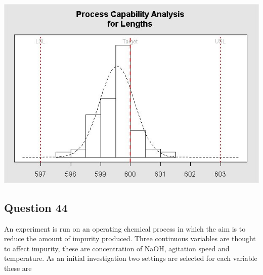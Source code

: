 \documentclass[a4paper,12pt]{article}
\begin{document}
\begin{center}
	\includegraphics[scale=0.55]{images/ExamQ4hist}
\end{center}
\newpage
%
%
%
\subsection*{Question 44}
An experiment is run on an operating chemical process in which the aim is to reduce the
amount of impurity produced. Three continuous variables are thought to affect impurity,
these are concentration of NaOH, agitation speed and temperature. As an initial investigation two settings are selected for each variable these are
\end{document}
